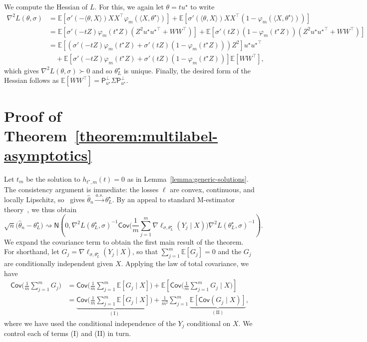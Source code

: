 \documentclass[11pt]{article}
\newcommand{\cov}{\mathsf{Cov}}
\newcommand{\E}{\mathbb{E}}
\newcommand{\what}[1]{\widehat{#1}}
\newcommand{\normal}{\mathsf{N}}
\newcommand{\proj}{\mathsf{P}}
\newcommand{\projperp}{\proj_{u\opt}^\perp}
\newcommand{\loss}{\ell}
\newcommand{\<}{\langle} %
\renewcommand{\>}{\rangle}
\newcommand{\cd}{\rightsquigarrow}
\newcommand{\cas}{\stackrel{a.s.}{\rightarrow}}
\newcommand{\opt}{^\star}
\begin{document}
We compute the Hessian of $L$. For this,
we again let $\theta = t u\opt$ to write
\begin{align*}
	\nabla^2 L(\theta, \sigma) & = \E[\sigma'(-\<\theta, X\>) XX^\top \varphi_m(\<X, \theta\opt\>)]
	+ \E[\sigma'(\<\theta, X\>) XX^\top (1 - \varphi_m(\<X, \theta\opt\>))] \\
	& = \E\left[\sigma'(-t Z) \varphi_m(t\opt Z)
	\left(Z^2 u\opt {u\opt}^\top + WW^\top\right)\right]
	+ \E\left[\sigma'(t Z) (1 - \varphi_m(t\opt Z))
	\left(Z^2 u\opt {u\opt}^\top + WW^\top \right)\right] \\
	& = \E\left[\left(\sigma'(-tZ) \varphi_m(t\opt Z)
	+ \sigma'(tZ) (1 - \varphi_m(t\opt Z)) \right) Z^2\right]
	u\opt {u\opt}^\top \\
	& \quad + \E\left[\sigma'(-tZ) \varphi_m(t\opt Z)
	+ \sigma'(tZ) (1 - \varphi_m(t\opt Z))\right] \E[WW^\top],
\end{align*}
which gives $\nabla^2 L(\theta, \sigma) \succ 0$ and so $\theta\opt_L$ is
unique.  Finally, the desired form of the Hessian follows as $\E[WW^\top] =
\projperp \Sigma \projperp$.

\section{Proof of Theorem~\ref{theorem:multilabel-asymptotics}}
\label{sec:proof-multilabel-asymptotics}

Let $t_m$ be the solution to $h_{t\opt,m}(t) = 0$ as in
Lemma~\ref{lemma:generic-solutions}. The consistency argument is
immediate: the losses $\loss$ are convex, continuous, and locally Lipschitz,
so~\citet[Thm.~5.4]{ShapiroDeRu09} gives $\what{\theta}_n
\cas \theta\opt_L$. By an appeal to standard
M-estimator theory~\cite[e.g.][Thm.~5.23]{VanDerVaart98},
we thus obtain
\begin{equation}
	\label{eqn:multilabel-basic-asymptote}
	\sqrt{n} \big(\what{\theta}_n - \theta\opt_L\big)
	\cd \normal\left(0, \nabla^2 L(\theta\opt_L, \sigma)^{-1}
	\cov\bigg(\frac{1}{m} \sum_{j = 1}^m
	\nabla \loss_{\sigma,\theta\opt_L}(Y_j \mid X)\bigg)
	\nabla^2 L(\theta\opt_L, \sigma)^{-1} \right).
\end{equation}
We expand the covariance term to obtain the first main result of the
theorem. For shorthand, let $G_j = \nabla \loss_{\sigma,\theta\opt_L}(Y_j
\mid X)$, so that $\sum_{j = 1}^m \E[G_j] = 0$ and the $G_j$ are
conditionally independent given $X$. Applying the law of total covariance,
we have
\begin{align*}
	\cov\bigg(\frac{1}{m} \sum_{j = 1}^m G_j\bigg)
	& = \cov\bigg(\frac{1}{m} \sum_{j = 1}^m
	\E[G_j \mid X]\bigg)
	+ \E\left[\cov\bigg(
	\frac{1}{m} \sum_{j = 1}^m G_j \mid X\bigg)\right] \\
	& =
	\underbrace{\cov\bigg(\frac{1}{m} \sum_{j = 1}^m \E[G_j \mid X] \bigg)}_{
		\mathrm{(I)}}
	+ \frac{1}{m^2} \sum_{j = 1}^m
	\underbrace{\E\left[\cov(G_j \mid X)\right]}_{\mathrm{(II)}},
\end{align*}
where we have used the conditional independence of the $Y_j$ conditional on
$X$.  We control each of terms (I) and (II) in turn.
\end{document}
